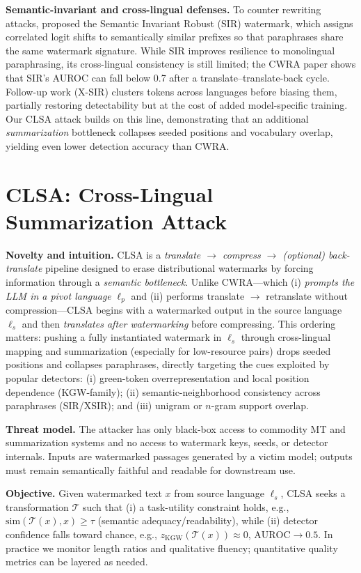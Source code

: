 \documentclass{article}
\begin{document}
\textbf{Semantic-invariant and cross-lingual defenses.}
To counter rewriting attacks, \citet{liu2024sir} proposed the Semantic Invariant Robust (SIR) watermark, which assigns correlated logit shifts to semantically similar prefixes so that paraphrases share the same watermark signature.
While SIR improves resilience to monolingual paraphrasing, its cross-lingual consistency is still limited; the CWRA paper shows that SIR's AUROC can fall below 0.7 after a translate–translate-back cycle.
Follow-up work (X-SIR) clusters tokens across languages before biasing them, partially restoring detectability but at the cost of added model-specific training.
Our CLSA attack builds on this line, demonstrating that an additional \emph{summarization} bottleneck collapses seeded positions and vocabulary overlap, yielding even lower detection accuracy than CWRA.

\section{CLSA: Cross-Lingual Summarization Attack}

\textbf{Novelty and intuition.}
CLSA is a \emph{translate $\rightarrow$ compress $\rightarrow$ (optional) back-translate} pipeline designed to erase distributional watermarks by forcing information through a \emph{semantic bottleneck}. Unlike CWRA—which (i) \emph{prompts the LLM in a pivot language} $\ell_p$ and (ii) performs translate $\rightarrow$ retranslate without compression—CLSA begins with a watermarked output in the source language $\ell_s$ and then \emph{translates after watermarking} before compressing. This ordering matters: pushing a fully instantiated watermark in $\ell_s$ through cross-lingual mapping and summarization (especially for low-resource pairs) drops seeded positions and collapses paraphrases, directly targeting the cues exploited by popular detectors: (i) green-token overrepresentation and local position dependence (KGW-family); (ii) semantic-neighborhood consistency across paraphrases (SIR/XSIR); and (iii) unigram or $n$-gram support overlap.

\textbf{Threat model.}
The attacker has only black-box access to commodity MT and summarization systems and no access to watermark keys, seeds, or detector internals. Inputs are watermarked passages generated by a victim model; outputs must remain semantically faithful and readable for downstream use.

\textbf{Objective.}
Given watermarked text $x$ from source language $\ell_s$, CLSA seeks a transformation $\mathcal{T}$ such that (i) a task-utility constraint holds, e.g., $\mathrm{sim}(\mathcal{T}(x), x) \ge \tau$ (semantic adequacy/readability), while (ii) detector confidence falls toward chance, e.g., $z_{\mathrm{KGW}}(\mathcal{T}(x)) \approx 0$, $\mathrm{AUROC} \rightarrow 0.5$. In practice we monitor length ratios and qualitative fluency; quantitative quality metrics can be layered as needed.
\end{document}
